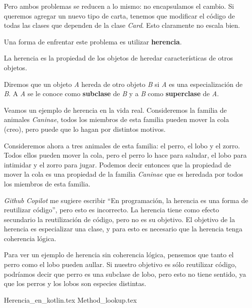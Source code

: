   Pero ambos problemas se reducen a lo mismo: no encapsulamos el cambio.
  Si queremos agregar un nuevo tipo de carta, tenemos que modificar el código de todas las clases
  que dependen de la clase \textit{Card}.
  Esto claramente no escala bien.

  Una forma de enfrentar este problema es utilizar \textbf{herencia}.

  \begin{defaultbox}[Herencia]
    La herencia es la propiedad de los objetos de heredar características de otros objetos.
    
    Diremos que un objeto \textit{A} hereda de otro objeto \textit{B} si \textit{A} es una
    especialización de \textit{B}.
    A \textit{A} se le conoce como \textbf{subclase} de \textit{B} y a \textit{B} como
    \textbf{superclase} de \textit{A}.
  \end{defaultbox}

  Veamos un ejemplo de herencia en la vida real.
  Consideremos la familia de animales \textit{Caninae}, todos los miembros de esta familia pueden
  mover la cola (creo), pero puede que lo hagan por distintos motivos.
  
  Consideremos ahora a tres animales de esta familia: el perro, el lobo y el zorro.
  Todos ellos pueden mover la cola, pero el perro lo hace para saludar, el lobo para intimidar y
  el zorro para jugar.
  Podemos decir entonces que la propiedad de mover la cola es una propiedad de la familia 
  \textit{Caninae} que es heredada por todos los miembros de esta familia.

  \textit{Github Copilot} me sugiere escribir \enquote{En programación, la herencia es una forma de 
  reutilizar código}, pero esto es incorrecto.
  La herencia tiene como efecto secundario la reutilización de código, pero no es su objetivo.
  El objetivo de la herencia es especializar una clase, y para esto es necesario que la herencia 
  tenga coherencia lógica.

  Para ver un ejemplo de herencia sin coherencia lógica, pensemos que tanto el perro como el lobo
  pueden aullar.
  Si nuestro objetivo es sólo reutilizar código, podríamos decir que perro es una subclase de lobo,
  pero esto no tiene sentido, ya que los perros y los lobos son especies distintas.

  {Herencia_en_kotlin.tex}
  {Method_lookup.tex}